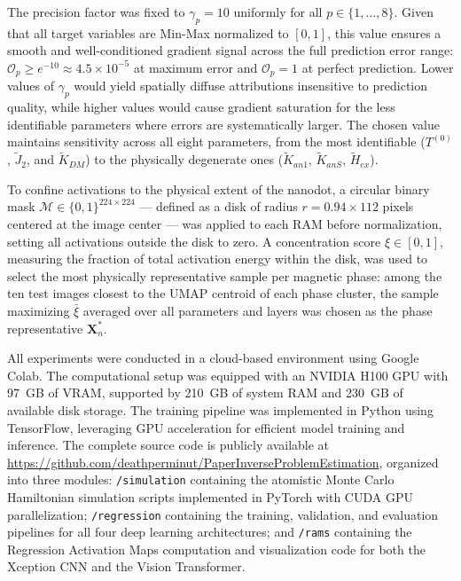 \documentclass[a4paper,fleqn]{cas-sc}
\begin{document}
The precision factor was fixed to 
$\gamma_p = 10$ uniformly for all 
$p \in \{1,\dots,8\}$. Given that all target 
variables are Min-Max normalized to $[0,1]$, 
this value ensures a smooth and well-conditioned 
gradient signal across the full prediction error 
range: $\mathcal{O}_p \geq e^{-10} \approx 
4.5\times10^{-5}$ at maximum error and 
$\mathcal{O}_p = 1$ at perfect prediction. 
Lower values of $\gamma_p$ would yield spatially 
diffuse attributions insensitive to prediction 
quality, while higher values would cause gradient 
saturation for the less identifiable parameters 
where errors are systematically larger. The 
chosen value maintains sensitivity across all 
eight parameters, from the most identifiable 
($T^{(0)}$, $\tilde{J}_2$, and $\tilde{K}_{DM}$) 
to the physically degenerate ones 
($\tilde{K}_{an1}$, $\tilde{K}_{anS}$, 
$\tilde{H}_{ex}$).

To confine activations to the physical extent 
of the nanodot, a circular binary mask 
$\mathcal{M}\in\{0,1\}^{224\times224}$ --- 
defined as a disk of radius $r = 0.94\times112$ 
pixels centered at the image center --- was 
applied to each RAM before normalization, 
setting all activations outside the disk to 
zero. A concentration score $\xi\in[0,1]$, 
measuring the fraction of total activation 
energy within the disk, was used to select 
the most physically representative sample per 
magnetic phase: among the ten test images 
closest to the UMAP centroid of each phase 
cluster, the sample maximizing $\bar{\xi}$ 
averaged over all parameters and layers was 
chosen as the phase representative 
$\mathbf{X}_n^*$.

All experiments were conducted in a cloud-based 
environment using Google Colab. The computational 
setup was equipped with an NVIDIA H100 GPU with 
97~GB of VRAM, supported by 210~GB of system RAM 
and 230~GB of available disk storage. The training 
pipeline was implemented in Python using TensorFlow, 
leveraging GPU acceleration for efficient model 
training and inference. The complete source code 
is publicly available at 
\url{https://github.com/deathperminut/PaperInverseProblemEstimation}, 
organized into three modules: 
\texttt{/simulation} containing the atomistic 
Monte Carlo Hamiltonian simulation scripts 
implemented in PyTorch with CUDA GPU 
parallelization; \texttt{/regression} containing 
the training, validation, and evaluation pipelines 
for all four deep learning architectures; and 
\texttt{/rams} containing the Regression Activation 
Maps computation and visualization code for both 
the Xception CNN and the Vision Transformer.
\end{document}
